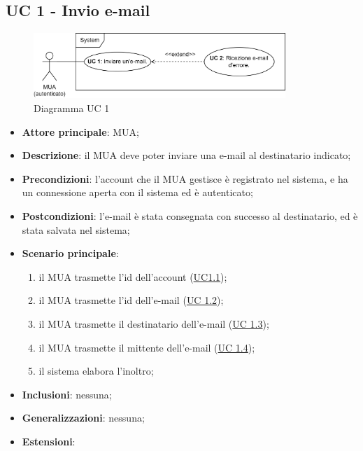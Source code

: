 \subsection{UC 1 - Invio e-mail} \label{sec:UC1}
    \begin{figure}[h]
        \includegraphics[width=0.85\textwidth]{sections/uc_imgs/UC01.png}
        \centering
        \caption{Diagramma UC 1}
    \end{figure}
    \begin{itemize}
        \item \textbf{Attore principale}: MUA;
        \item \textbf{Descrizione}: il MUA deve poter inviare una e-mail al destinatario indicato;
        \item \textbf{Precondizioni}: l’account che il MUA gestisce è registrato nel sistema, e ha un connessione aperta con il sistema ed è autenticato;
        \item \textbf{Postcondizioni}: l'e-mail è stata consegnata con successo al destinatario, ed è stata salvata nel sistema;
        \item \textbf{Scenario principale}:
            \begin{enumerate}
                \item il MUA trasmette l'id dell'account (\hyperref[sec:UC1.1]{UC1.1});
                \item il MUA trasmette l'id dell'e-mail (\hyperref[sec:UC1.2]{UC 1.2});
                \item il MUA trasmette il destinatario dell'e-mail (\hyperref[sec:UC1.3]{UC 1.3});
                \item il MUA trasmette il mittente dell'e-mail (\hyperref[sec:UC1.4]{UC 1.4});
                \item il sistema elabora l'inoltro;
            \end{enumerate}
        \item \textbf{Inclusioni}: nessuna;
        \item \textbf{Generalizzazioni}: nessuna;
        \item \textbf{Estensioni}: 
        


\end{itemize}
